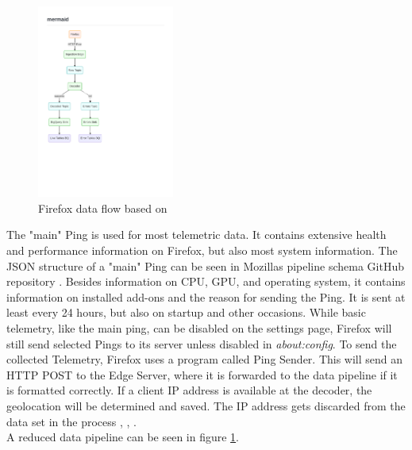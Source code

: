         \begin{figure}
            \centering
            \includegraphics[clip, trim=0.5cm 8cm 8cm 3.5cm, width=0.4\textwidth]{latex/figures/firefox_telemetry_graph}
            \caption[Firefox data flow]{Firefox data flow based on  \cite{mozilla_overview_2020}}
            \label{fig:moz_data_flow}
        \end{figure}
        
        The "main" Ping is used for most telemetric data. It contains extensive health and performance information on Firefox, but also most system information. The JSON structure of a "main" Ping can be seen in Mozillas pipeline schema GitHub repository \cite{mozilla_mozilla-servicesmozilla-pipeline-schemas_2020}. 
        Besides information on CPU, GPU, and operating system, it contains information on installed add-ons and the reason for sending the Ping.
        It is sent at least every 24 hours, but also on startup and other occasions. While basic telemetry, like the main ping, can be disabled on the settings page, Firefox will still send selected Pings to its server unless disabled in \textit{about:config}.
        To send the collected Telemetry, Firefox uses a program called Ping Sender.
        This will send an HTTP POST to the Edge Server, where it is forwarded to the data pipeline if it is formatted correctly.
        If a client IP address is available at the decoder, the geolocation will be determined and saved.
        The IP address gets discarded from the data set in the process \cite{mozilla_overview_2020}, \cite{mozilla_http_2020}, \cite{firefox_ping_nodate}.\\
        A reduced data pipeline can be seen in figure \ref{fig:moz_data_flow}.
        
